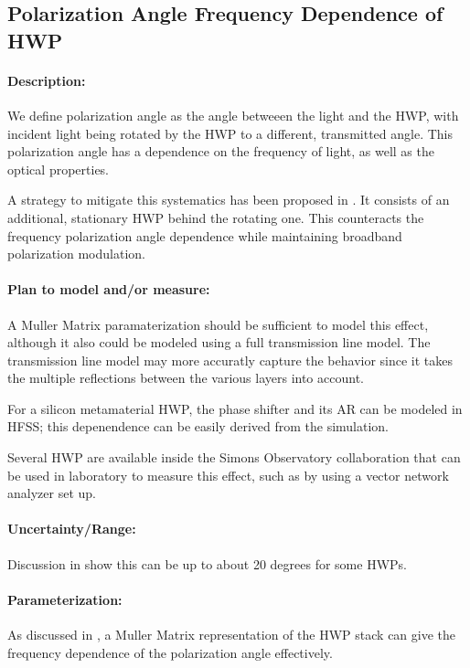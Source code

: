\subsection{Polarization Angle Frequency Dependence of HWP}

\paragraph{Description:}

We define polarization angle as the angle betweeen the light and the HWP, with incident light being rotated by the HWP to a different, transmitted angle. This polarization angle has a dependence on the frequency of light, as well as the optical properties.

A strategy to mitigate this systematics has been proposed in \cite{Matsumura14}. It consists of an additional, stationary HWP behind the rotating one. This counteracts the frequency polarization angle dependence while maintaining broadband polarization modulation. 

\paragraph{Plan to model and/or measure:}
A Muller Matrix paramaterization should be sufficient to model this effect, although it also could be modeled using a full transmission line model.  The transmission line model may more accuratly capture the behavior since it takes the multiple reflections between the various layers into account.

For a silicon metamaterial HWP, the phase shifter and its AR can be modeled in HFSS; this depenendence can be easily derived from the simulation.

Several HWP are available inside the Simons Observatory collaboration that can be used in laboratory to measure this effect, such as by using a vector network analyzer set up.

\paragraph{Uncertainty/Range:}
Discussion in \cite{Matsumura09} show this can be up to about 20 degrees for some HWPs.




\paragraph{Parameterization:}

As discussed in \cite{Matsumura09}, a Muller Matrix representation of the HWP stack can give the frequency dependence of the polarization angle effectively.


